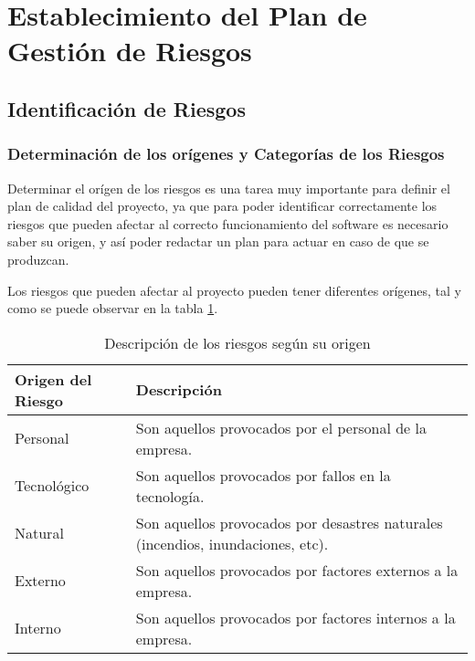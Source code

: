 

\section{Establecimiento del Plan de Gestión de Riesgos}
\subsection{Identificación de Riesgos}
\subsubsection{Determinación de los orígenes y Categorías de los Riesgos}
\par Determinar el orígen de los riesgos es una tarea muy importante para definir el plan de calidad del proyecto, ya que para poder identificar correctamente los riesgos que pueden afectar al correcto funcionamiento del software es necesario saber su origen, y así poder redactar un plan para actuar en caso de que se produzcan.

\par Los riesgos que pueden afectar al proyecto pueden tener diferentes orígenes, tal y como se puede observar en la tabla \ref{tab:origenRiesgos}.






\begin{table}[h]
\begin{center}
\begin{tabular}{p{} p{11cm}}
\textbf{Origen del Riesgo} & \textbf{Descripción}\\ \hline
Personal & Son aquellos provocados por el personal de la empresa. \\
Tecnológico &  Son aquellos provocados por fallos en la tecnología.\\
Natural &  Son aquellos provocados por desastres naturales (incendios, inundaciones, etc).\\
Externo &  Son aquellos provocados por factores externos a la empresa.\\
Interno & Son aquellos provocados por factores internos a la empresa. \\ \hline
\end{tabular}
\caption{Descripción de los riesgos según su origen}
\label{tab:origenRiesgos}
\end{center}
\end{table}




